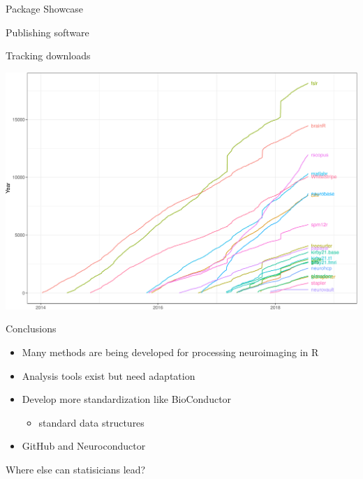 \documentclass[ignorenonframetext,]{beamer}
\providecommand{\tightlist}{%
  \setlength{\itemsep}{0pt}\setlength{\parskip}{0pt}}
\begin{document}
\begin{frame}[fragile]{Package Showcase}
\begin{block}{Publishing software}
\end{block}

\begin{block}{Tracking downloads}

\includegraphics{index_files/figure-beamer/unnamed-chunk-18-1.pdf}

\end{block}

\begin{block}{Conclusions}

\begin{itemize}
\tightlist
\item
  Many methods are being developed for processing neuroimaging in R
\item
  Analysis tools exist but need adaptation
\item
  Develop more standardization like BioConductor

  \begin{itemize}
  \tightlist
  \item
    standard data structures
  \end{itemize}
\item
  GitHub and Neuroconductor
\end{itemize}

\end{block}

\end{frame}

\begin{frame}{Where else can statisicians lead?}
\protect\hypertarget{where-else-can-statisicians-lead}{}

\end{frame}
\end{document}

